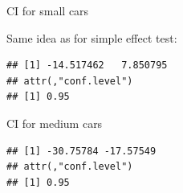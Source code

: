 \documentclass[
  ignorenonframetext,
]{beamer}
\newenvironment{Shaded}{\begin{snugshade}}{\end{snugshade}}
\newcommand{\DataTypeTok}[1]{\textcolor[rgb]{0.13,0.29,0.53}{#1}}
\newcommand{\KeywordTok}[1]{\textcolor[rgb]{0.13,0.29,0.53}{\textbf{#1}}}
\newcommand{\NormalTok}[1]{#1}
\newcommand{\OperatorTok}[1]{\textcolor[rgb]{0.81,0.36,0.00}{\textbf{#1}}}
\newcommand{\StringTok}[1]{\textcolor[rgb]{0.31,0.60,0.02}{#1}}
\begin{document}
\begin{frame}[fragile]{CI for small cars}
\protect\hypertarget{ci-for-small-cars}{}

Same idea as for simple effect test:

\begin{Shaded}
\end{Shaded}

\begin{verbatim}
## [1] -14.517462   7.850795
## attr(,"conf.level")
## [1] 0.95
\end{verbatim}

\end{frame}

\begin{frame}[fragile]{CI for medium cars}
\protect\hypertarget{ci-for-medium-cars}{}

\begin{Shaded}
\end{Shaded}

\begin{verbatim}
## [1] -30.75784 -17.57549
## attr(,"conf.level")
## [1] 0.95
\end{verbatim}

\end{frame}
\end{document}
